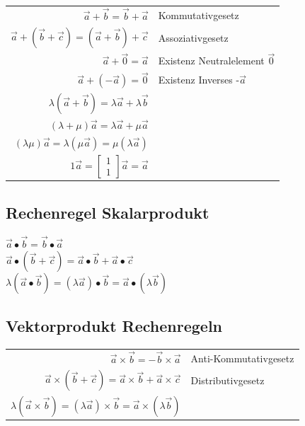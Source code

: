 \begin{tabular}{r|l}
    $\vec{a} + \vec{b} = \vec{b} + \vec{a}$ & Kommutativgesetz \\
    $\vec{a} + (\vec{b} + \vec{c}) = (\vec{a} + \vec{b}) + \vec{c}$ & Assoziativgesetz \\
    $\vec{a} + \vec{0} = \vec{a}$ & Existenz Neutralelement $\vec{0}$ \\
    $\vec{a} + (-\vec{a}) = \vec{0}$ & Existenz Inverses -$\vec{a}$ \\
    $\lambda(\vec{a} + \vec{b}) = \lambda \vec{a} + \lambda \vec{b}$ \\
    $(\lambda + \mu) \vec{a} = \lambda \vec{a} + \mu \vec{a}$ \\
    $(\lambda \mu) \vec{a} = \lambda(\mu \vec{a}) = \mu (\lambda \vec{a})$ \\
    $1 \vec{a} = \begin{bmatrix}
        1 \\
        1
    \end{bmatrix} \vec{a} = \vec{a}$

\end{tabular}

\subsection{Rechenregel Skalarprodukt}

$\vec{a} \bullet \vec{b} = \vec{b} \bullet \vec{a}$ \\
$\vec{a} \bullet (\vec{b} + \vec{c}) = \vec{a} \bullet \vec{b} + \vec{a} \bullet \vec{c}$ \\
$\lambda (\vec{a} \bullet \vec{b}) = (\lambda \vec{a}) \bullet \vec{b} = \vec{a} \bullet (\lambda \vec{b})$

\subsection{Vektorprodukt Rechenregeln}

\begin{tabular}{r|l}
    $\vec{a} \times \vec{b} = -\vec{b} \times \vec{a}$ & Anti-Kommutativgesetz \\
    $\vec{a} \times (\vec{b} + \vec{c}) = \vec{a} \times \vec{b} + \vec{a} \times \vec{c}$ & Distributivgesetz \\
    $\lambda (\vec{a} \times \vec{b}) = (\lambda \vec{a}) \times \vec{b} = \vec{a} \times (\lambda \vec{b})$
\end{tabular}

